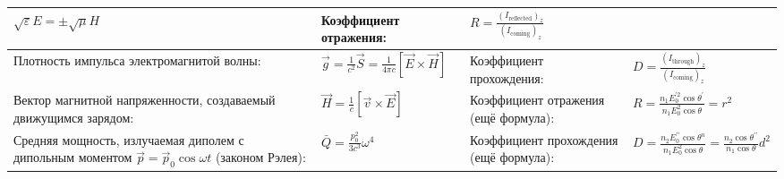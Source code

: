 \documentclass{article}
\begin{document}
\begin{tabular}{ |p{5cm}|p{4.5cm}|p{6cm}|p{3.5cm}|  }
$\sqrt{\varepsilon} E=\pm \sqrt{\mu} H$                                    &
Коэффициент отражения:                                                     &
$R=\frac{\left(I_{\mathrm{reflected}}\right)_{z}}{\left(I_{\mathrm{coming}}\right)_{z}}$\\
\hline
Плотность импульса электромагнитой волны:                                  &
$\vec{g}=\frac{1}{c^{2}} \vec{S}=\frac{1}{4 \pi c} [\vec{E} \times \vec{H}]$&
Коэффициент прохождения:                                                   &
$D=\frac{\left(I_{\text {through}}\right)_{z}}{\left(I_{\text {coming}}\right)_{z}}$ \\
\hline
Вектор магнитной напряженности, создаваемый движущимся зарядом:            &
$\vec{H}=\frac{1}{c} [\vec{v} \times \vec{E}]$                             &
Коэффициент отражения (ещё формула):                                       &
$R=\frac{n_{1} E_{0}^{\prime 2} \cos \theta^{\prime}}{n_{1} E_{0}^{2} \cos \theta}=r^{2}$\\
\hline
Средняя мощность, излучаемая диполем с дипольным моментом $\vec{p}=\vec{p}_{0} \cos \omega t$ (законом Рэлея):&
$\bar{Q}=\frac{p_{0}^{2}}{3 c^{3}} \omega^{4}$                             &
Коэффициент прохождения (ещё формула):                                     &
$D=\frac{n_{2} E_{0}^{\prime \prime} \cos \theta^{n}}{n_{1} E_{0}^{2} \cos \theta}=\frac{n_{2} \cos \theta^{\prime \prime}}{n_{1} \cos \theta} d^{2}$\\
\hline
\end{tabular}

\newpage
\end{document}
